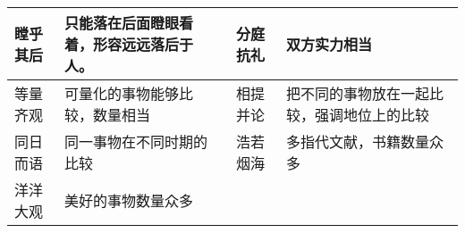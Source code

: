 \begin{longtable}{|p{}|p{}|p{}|p{}|}
    \hline
    瞠乎其后        & 只能落在后面瞪眼看着，形容远远落后于人。               & 分庭抗礼        & 双方实力相当                    \\
    \hline
    等量齐观        & 可量化的事物能够比较，数量相当                    & 相提并论        & 把不同的事物放在一起比较，强调地位上的比较     \\
    \hline
    同日而语        & 同一事物在不同时期的比较                       & 浩若烟海        & 多指代文献，书籍数量众多              \\
    \hline
    洋洋大观        & 美好的事物数量众多                          &             &                           \\
\end{longtable}

